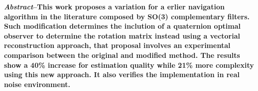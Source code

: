 \documentclass[conference]{IEEEtran}
\begin{document}
\maketitle
\textbf{\small \emph{Abstract}--This work proposes a variation for a erlier navigation algorithm in the literature composed by SO(3) complementary filters. Such modification determines the inclution of a quaternion optimal observer to determine  the rotation matrix instead using a vectorial reconstruction approach, that proposal involves an experimental comparison between the original and modified method. The results show a 40\% increase for estimation quality while 21\% more complexity using this new approach. It also verifies the implementation in real noise environment.\\[3mm]}





%
\IEEEpeerreviewmaketitle
\end{document}
